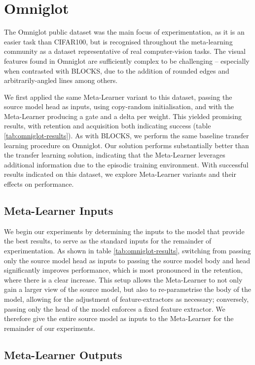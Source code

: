 \documentclass{report}
\begin{document}
\section{Omniglot}
The Omniglot\parencite{omniglot} public dataset was the main focus of experimentation, as it is an easier task than CIFAR100, but is recognised throughout the meta-learning community as a dataset representative of real computer-vision tasks. The visual features found in Omniglot are sufficiently complex to be challenging -- especially when contrasted with BLOCKS, due to the addition of rounded edges and arbitrarily-angled lines among others. \par
We first applied the same Meta-Learner variant to this dataset, passing the source model head as inputs, using copy-random initialisation, and with the Meta-Learner producing a gate and a delta per weight. This yielded promising results, with retention and acquisition both indicating success (table \ref{tab:omniglot-results}). As with BLOCKS, we perform the same baseline transfer learning procedure on Omniglot. Our solution performs substantially better than the transfer learning solution, indicating that the Meta-Learner leverages additional information due to the episodic training environment. With successful results indicated on this dataset, we explore Meta-Learner variants and their effects on performance. \par

\subsection{Meta-Learner Inputs}
We begin our experiments by determining the inputs to the model that provide the best results, to serve as the standard inputs for the remainder of experimentation. As shown in table \ref{tab:omniglot-results}, switching from passing only the source model head as inputs to passing the source model body and head significantly improves performance, which is most pronounced in the retention, where there is a clear increase. This setup allows the Meta-Learner to not only gain a larger view of the source model, but also to re-parametrise the body of the model, allowing for the adjustment of feature-extractors as necessary; conversely, passing only the head of the model enforces a fixed feature extractor. We therefore give the entire source model as inputs to the Meta-Learner for the remainder of our experiments. 

\subsection{Meta-Learner Outputs}
\end{document}
